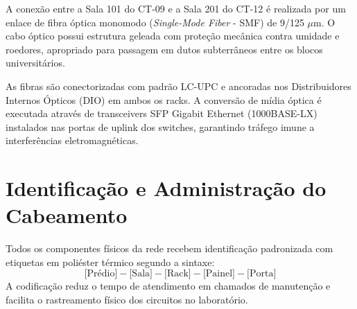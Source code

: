 A conexão entre a Sala 101 do CT-09 e a Sala 201 do CT-12 é realizada por um enlace de fibra óptica monomodo (\textit{Single-Mode Fiber} - SMF) de 9/125 $\mu$m. O cabo óptico possui estrutura geleada com proteção mecânica contra umidade e roedores, apropriado para passagem em dutos subterrâneos entre os blocos universitários.

As fibras são conectorizadas com padrão LC-UPC e ancoradas nos Distribuidores Internos Ópticos (DIO) em ambos os racks. A conversão de mídia óptica é executada através de transceivers SFP Gigabit Ethernet (1000BASE-LX) instalados nas portas de uplink dos switches, garantindo tráfego imune a interferências eletromagnéticas.

\section{Identificação e Administração do Cabeamento}

Todos os componentes físicos da rede recebem identificação padronizada com etiquetas em poliéster térmico segundo a sintaxe:
\[
\text{[Prédio]}-\text{[Sala]}-\text{[Rack]}-\text{[Painel]}-\text{[Porta]}
\]
A codificação reduz o tempo de atendimento em chamados de manutenção e facilita o rastreamento físico dos circuitos no laboratório.
